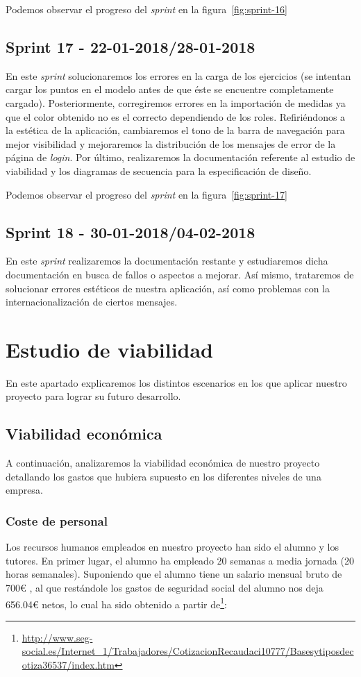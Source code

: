 Podemos observar el progreso del \textit{sprint} en la figura~\ref{fig:sprint-16}

\subsection{Sprint 17 - 22-01-2018/28-01-2018}
En este \textit{sprint} solucionaremos los errores en la carga de los ejercicios (se intentan cargar los puntos en el modelo antes de que éste se encuentre completamente cargado). Posteriormente, corregiremos errores en la importación de medidas ya que el color obtenido no es el correcto dependiendo de los roles. Refiriéndonos a la estética de la aplicación, cambiaremos el tono de la barra de navegación para mejor visibilidad y mejoraremos la distribución de los mensajes de error de la página de \textit{login}. Por último, realizaremos la documentación referente al estudio de viabilidad y los diagramas de secuencia para la especificación de diseño.

Podemos observar el progreso del \textit{sprint} en la figura~\ref{fig:sprint-17}

\subsection{Sprint 18 - 30-01-2018/04-02-2018}
En este \textit{sprint} realizaremos la documentación restante y estudiaremos dicha documentación en busca de fallos o aspectos a mejorar. Así mismo, trataremos de solucionar errores estéticos de nuestra aplicación, así como problemas con la internacionalización de ciertos mensajes.


\section{Estudio de viabilidad}
En este apartado explicaremos los distintos escenarios en los que aplicar nuestro proyecto para lograr su futuro desarrollo.

\subsection{Viabilidad económica}
A continuación, analizaremos la viabilidad económica de nuestro proyecto detallando los gastos que hubiera supuesto en los diferentes niveles de una empresa.

\subsubsection{Coste de personal}
Los recursos humanos empleados en nuestro proyecto han sido el alumno y los tutores. En primer lugar, el alumno ha empleado 20 semanas a media jornada (20 horas semanales). Suponiendo que el alumno tiene un salario mensual bruto de 700\euro{} , al que restándole los gastos de seguridad social del alumno nos deja 656.04\euro{} netos, lo cual ha sido obtenido a partir de\footnote{\url{http://www.seg-social.es/Internet_1/Trabajadores/CotizacionRecaudaci10777/Basesytiposdecotiza36537/index.htm}}:

